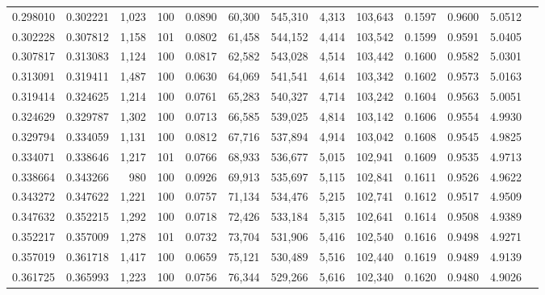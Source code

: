 \begin{tabular}{rrrrrrrrrrrrr}
0.298010 & 0.302221 & 1,023 & 100 &                                     0.0890 &  60,300 & 545,310 &   4,313 & 103,643 & 0.1597 & 0.9600 & 5.0512 \\
0.302228 & 0.307812 & 1,158 & 101 &                                     0.0802 &  61,458 & 544,152 &   4,414 & 103,542 & 0.1599 & 0.9591 & 5.0405 \\
0.307817 & 0.313083 & 1,124 & 100 &                                     0.0817 &  62,582 & 543,028 &   4,514 & 103,442 & 0.1600 & 0.9582 & 5.0301 \\
0.313091 & 0.319411 & 1,487 & 100 &                                     0.0630 &  64,069 & 541,541 &   4,614 & 103,342 & 0.1602 & 0.9573 & 5.0163 \\
0.319414 & 0.324625 & 1,214 & 100 &                                     0.0761 &  65,283 & 540,327 &   4,714 & 103,242 & 0.1604 & 0.9563 & 5.0051 \\
0.324629 & 0.329787 & 1,302 & 100 &                                     0.0713 &  66,585 & 539,025 &   4,814 & 103,142 & 0.1606 & 0.9554 & 4.9930 \\
0.329794 & 0.334059 & 1,131 & 100 &                                     0.0812 &  67,716 & 537,894 &   4,914 & 103,042 & 0.1608 & 0.9545 & 4.9825 \\
0.334071 & 0.338646 & 1,217 & 101 &                                     0.0766 &  68,933 & 536,677 &   5,015 & 102,941 & 0.1609 & 0.9535 & 4.9713 \\
0.338664 & 0.343266 &   980 & 100 &                                     0.0926 &  69,913 & 535,697 &   5,115 & 102,841 & 0.1611 & 0.9526 & 4.9622 \\
0.343272 & 0.347622 & 1,221 & 100 &                                     0.0757 &  71,134 & 534,476 &   5,215 & 102,741 & 0.1612 & 0.9517 & 4.9509 \\
0.347632 & 0.352215 & 1,292 & 100 &                                     0.0718 &  72,426 & 533,184 &   5,315 & 102,641 & 0.1614 & 0.9508 & 4.9389 \\
0.352217 & 0.357009 & 1,278 & 101 &                                     0.0732 &  73,704 & 531,906 &   5,416 & 102,540 & 0.1616 & 0.9498 & 4.9271 \\
0.357019 & 0.361718 & 1,417 & 100 &                                     0.0659 &  75,121 & 530,489 &   5,516 & 102,440 & 0.1619 & 0.9489 & 4.9139 \\
0.361725 & 0.365993 & 1,223 & 100 &                                     0.0756 &  76,344 & 529,266 &   5,616 & 102,340 & 0.1620 & 0.9480 & 4.9026 \\

\end{tabular}
